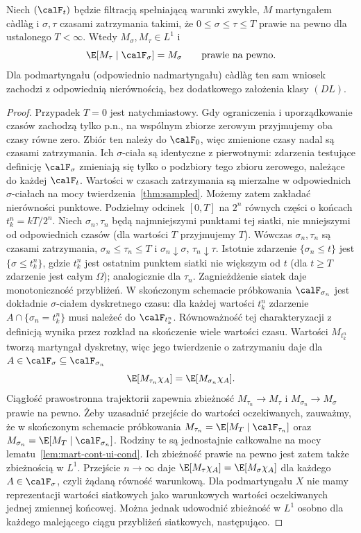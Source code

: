 \begin{twierdzenie}
\label{thm:ost-cont}
Niech $(\calF_t)$ będzie filtracją spełniającą
warunki zwykłe, $M$ martyngałem
c\`adl\`ag i $\sigma,\tau$ czasami zatrzymania takimi,
że $0\le\sigma\le\tau\le T$ prawie na pewno dla ustalonego
$T<\infty$. Wtedy $M_\sigma,M_\tau\in L^1$ i
\[
\E[M_\tau\mid\calF_\sigma]=M_\sigma
\qquad\text{prawie na pewno}.
\]
Dla podmartyngału (odpowiednio nadmartyngału) c\`adl\`ag
ten sam wniosek zachodzi z odpowiednią nierównością,
bez dodatkowego założenia klasy $(DL)$.
\end{twierdzenie}
\begin{proof}
Przypadek $T=0$ jest natychmiastowy.
Gdy ograniczenia i uporządkowanie czasów zachodzą
tylko p.n., na wspólnym zbiorze zerowym przyjmujemy
oba czasy równe zero. Zbiór ten należy do $\calF_0$,
więc zmienione czasy nadal są czasami zatrzymania.
Ich $\sigma$-ciała są identyczne z pierwotnymi:
zdarzenia testujące definicję $\calF_\sigma$
zmieniają się tylko o podzbiory tego zbioru zerowego,
należące do każdej $\calF_t$.
Wartości w czasach zatrzymania są mierzalne
w odpowiednich $\sigma$-ciałach na mocy
twierdzenia~\ref{thm:sampled}.
Możemy zatem zakładać nierówności punktowe.
Podzielmy odcinek $[0,T]$ na $2^n$ równych części
o końcach $t_k^n=kT/2^n$. Niech $\sigma_n,\tau_n$
będą najmniejszymi punktami tej siatki, nie mniejszymi
od odpowiednich czasów (dla wartości $T$ przyjmujemy $T$).
Wówczas $\sigma_n,\tau_n$ są czasami zatrzymania,
$\sigma_n\le\tau_n\le T$ i
$\sigma_n\downarrow\sigma$, $\tau_n\downarrow\tau$.
Istotnie zdarzenie $\{\sigma_n\le t\}$ jest
$\{\sigma\le t_k^n\}$, gdzie $t_k^n$ jest ostatnim
punktem siatki nie większym od $t$ (dla $t\ge T$
zdarzenie jest całym $\Omega$); analogicznie dla $\tau_n$.
Zagnieżdżenie siatek daje monotoniczność przybliżeń.
W skończonym schemacie próbkowania $\calF_{\sigma_n}$
jest dokładnie $\sigma$-ciałem dyskretnego czasu:
dla każdej wartości $t_k^n$ zdarzenie
$A\cap\{\sigma_n=t_k^n\}$ musi należeć
do $\calF_{t_k^n}$. Równoważność tej charakteryzacji
z definicją wynika przez rozkład na skończenie wiele
wartości czasu.
Wartości $M_{t_k^n}$ tworzą martyngał dyskretny, więc
jego twierdzenie o zatrzymaniu daje dla
$A\in\calF_\sigma\subseteq\calF_{\sigma_n}$
\[
\E[M_{\tau_n}\chi_A]=\E[M_{\sigma_n}\chi_A].
\]
Ciągłość prawostronna trajektorii zapewnia zbieżność
$M_{\tau_n}\to M_\tau$ i $M_{\sigma_n}\to M_\sigma$
prawie na pewno. Żeby uzasadnić przejście do wartości
oczekiwanych, zauważmy, że w skończonym schemacie próbkowania
$M_{\tau_n}=\E[M_T\mid\calF_{\tau_n}]$ oraz
$M_{\sigma_n}=\E[M_T\mid\calF_{\sigma_n}]$.
Rodziny te są jednostajnie całkowalne na mocy
lematu~\ref{lem:mart-cont-ui-cond}. Ich zbieżność prawie na pewno
jest zatem także zbieżnością w $L^1$.
Przejście $n\to\infty$ daje
$\E[M_\tau\chi_A]=\E[M_\sigma\chi_A]$ dla każdego
$A\in\calF_\sigma$, czyli żądaną równość warunkową.
Dla podmartyngału $X$ nie mamy reprezentacji
wartości siatkowych jako warunkowych wartości
oczekiwanych jednej zmiennej końcowej. Można jednak
udowodnić zbieżność w $L^1$ osobno dla każdego
malejącego ciągu przybliżeń siatkowych, następująco.


\end{proof}
